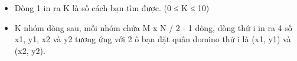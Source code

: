\begin{itemize}
	\item     Dòng 1 in ra K là số cách bạn tìm được. (0 ≤ K ≤ 10)   
	\item     K nhóm dòng sau, mỗi nhóm chứa M x N / 2 - 1 dòng, dòng thứ i in ra 4 số x1, y1, x2 và y2 tương ứng với 2 ô bạn đặt quân domino thứ i là (x1, y1) và (x2, y2).   
\end{itemize}